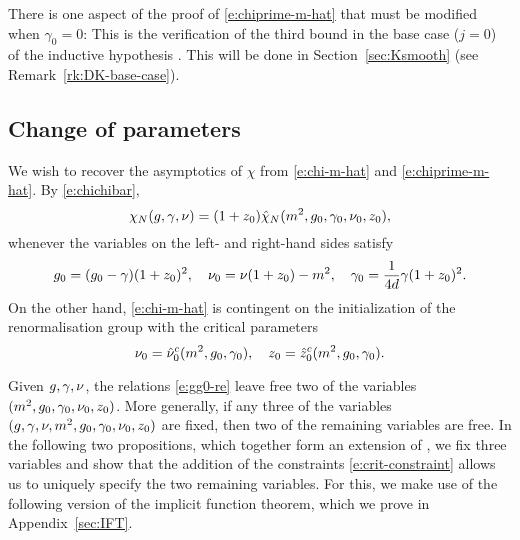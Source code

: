\begin{rk}
There is one aspect of the proof of \eqref{e:chiprime-m-hat} that must be modified when
$\gamma_0 = 0$: This is the verification of the third bound
in the base case ($j = 0$) of the inductive hypothesis \cite[\eqref{log-e:induct1}]{BBS-saw4-log}.
This will be done in Section~\ref{sec:Ksmooth} (see Remark~\ref{rk:DK-base-case}).
\end{rk}


\subsection{Change of parameters}
\label{sec:nuztilde}

We wish to recover the asymptotics of $\chi$ from \eqref{e:chi-m-hat} and
\eqref{e:chiprime-m-hat}. By \eqref{e:chichibar},
\begin{equation}
\label{e:chichihat}
\chi_N(g, \gamma, \nu)
	=
(1 + z_0) \hat\chi_N(m^2, g_0, \gamma_0, \nu_0, z_0),
\end{equation}
whenever the variables on the left- and right-hand sides satisfy
\begin{equation}
\label{e:gg0-re}
g_0 = (g_0 - \gamma) (1 + z_0)^2,
\quad
\nu_0 = \nu (1 + z_0) - m^2,
\quad
\gamma_0 = \frac{1}{4d} \gamma (1 + z_0)^2.
\end{equation}
On the other hand, \eqref{e:chi-m-hat} is contingent on the initialization of
the renormalisation group with the critical parameters
\begin{equation}
\label{e:crit-constraint}
\nu_0 = \hat \nu_0^c(m^2, g_0, \gamma_0),
	\quad
z_0   = \hat z_0^c(m^2, g_0, \gamma_0).
\end{equation}

Given $g,\gamma,\nu$,
the relations \eqref{e:gg0-re} leave free two of the variables
$(m^2, g_0, \gamma_0, \nu_0, z_0)$.
More generally, if any three of the variables
$(g, \gamma, \nu, m^2, g_0, \gamma_0, \nu_0, z_0)$
are fixed, then two of the remaining variables are free.
In the following two propositions, which together form an extension of
\cite[Proposition~\ref{log-prop:changevariables}]{BBS-saw4-log},
we fix three variables and show that the addition of the constraints
\eqref{e:crit-constraint}
allows us to uniquely specify the two remaining variables.
For this, we make use of the following version of the
implicit function theorem, which we prove in Appendix~\ref{sec:IFT}.

